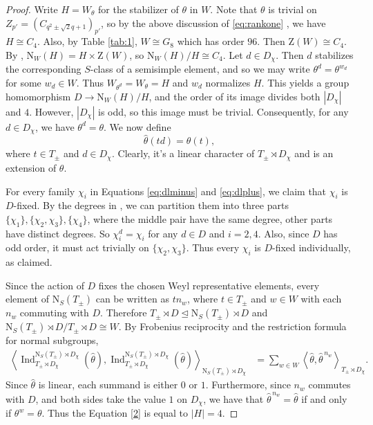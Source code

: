 \documentclass[11pt,a4paper]{article}
\numberwithin{equation}{section}
\theoremstyle{definition}
\theoremstyle{remark}
\newcommand{\ZZ}{\mathrm{Z}}
\newcommand{\NN}{\mathrm N}
\newcommand{\Ind}{\operatorname{Ind}}
\begin{document}
\begin{proof}
Write $H=W_\theta$ for the stabilizer of $\theta$ in $W$. Note that $\theta$ is trivial on $Z_{p'}=(C_{ q^2\pm\sqrt{2}q+1})_{p'}$,  so by the above discussion of \eqref{eq:rankone} , we have $H\cong C_4$. Also, by Table \ref{tab:1}, $W\cong G_8$ which has order $96$. Then $\ZZ(W)\cong C_4$. By \cite[Theorem 5.5]{MT18}, $\NN_W(H)=H\times \ZZ(W)$, so $\NN_W(H)/H\cong C_4$. Let \(d\in D_\chi\). Then \(d\) stabilizes the corresponding $S$-class of a semisimple element, and so we may write $\theta^d=\theta^{w_d}$ for some $w_d\in W$.
Thus  $W_{\theta^d}=W_\theta=H$ and \(w_d\) normalizes \(H\). This yields a group homomorphism $D\longrightarrow\NN_W(H)/H$, and the order of its image divides both \(|D_\chi|\) and \(4\). However, \(|D_\chi|\) is odd, so this image must be trivial. Consequently, for 
any $d\in D_\chi$, we have $\theta^d=\theta$. We now define
\[
\widehat\theta(td)=\theta(t),
\]
where $t\in T_{\pm}$ and $ d\in D_\chi$. Clearly, it's a linear character of $T_{\pm}\rtimes D_\chi$ and is 
an extension of $\theta$.

For every family \(\chi_i\) in Equations \eqref{eq:dlminus} and \eqref{eq:dlplus}, we claim that $\chi_i$ is $D$-fixed.  By the degrees in \cite[Table~A.2]{Himstedt},  we can partition them into three parts $\{\chi_1\}, \{\chi_2,\chi_3\}, \{\chi_4\}$, where the middle pair have the same degree, other parts have distinct degrees. So $\chi_i^d=\chi_i$ for any $d\in D$ and $i=2,4$. Also, since $D$ has odd order, it must act trivially on $\{\chi_2,\chi_3\}$. Thus every $\chi_i$ is $D$-fixed individually, as claimed. 

Since the action of $D$ fixes the chosen Weyl representative elements, every element of \(\NN_S(T_{\pm})\) can be written as $tn_w$, where $t\in T_{\pm}$ and $w\in W$ with each \(n_w\) commuting with \(D\). Therefore
$T_{\pm}\rtimes D\unlhd \NN_S(T_\pm)\rtimes D$ 
and  $\NN_S(T_\pm)\rtimes D/T_{\pm}\rtimes D\cong W$.
By Frobenius reciprocity and the restriction formula for normal subgroups,
\begin{equation}\label{2}
\begin{aligned}
\left\langle
\Ind_{T_\pm\rtimes D_\chi}^{\NN_S(T_\pm)\rtimes D_\chi}(\widehat \theta),
\Ind_{T_\pm\rtimes D_\chi}^{\NN_S(T_\pm)\rtimes D_\chi}(\widehat \theta)
\right\rangle_{\NN_S(T_\pm)\rtimes D_\chi}
&=
\sum_{w\in W}
\left\langle
\widehat\theta,\widehat\theta^{\,n_w}
\right\rangle_{T_\pm\rtimes D_\chi}.
\end{aligned}
\end{equation}
Since \(\widehat\theta\) is linear, each summand is either \(0\) or \(1\). Furthermore, since \(n_w\) commutes with \(D\), and  both sides take the value \(1\) on \(D_\chi\), we have that $\widehat\theta^{\,n_w}=\widehat\theta$ if and only if  $\theta^w=\theta$. Thus the Equation \eqref{2} is equal to $|H|=4$.


\end{proof}
\end{document}
